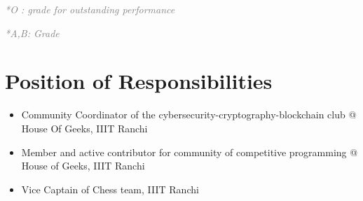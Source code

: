 \documentclass[a4,10pt]{article}
\def\gray#1{\textcolor{gray}{#1}}
\newenvironment{zitemize}{
\begin{itemize}\itemsep0pt \parskip0pt \parsep1pt}
{\end{itemize}\vspace{-0.5cm}}
\begin{document}
\vspace{0.2cm}
\renewcommand\refname{\vskip -1.5em}
\hspace{2.5 cm}
\begin{minipage}[t]{.4\linewidth}
     \gray{\emph{*O : grade for outstanding performance}}  
\end{minipage}%
\begin{minipage}[t]{.3\linewidth}
     \gray{\emph{*A,B: Grade}}
\end{minipage}%

\vspace{-0.4cm}



\section{Position of Responsibilities}
\begin{zitemize}
\item Community Coordinator of the cybersecurity-cryptography-blockchain club @ House Of Geeks, IIIT Ranchi 
\item Member and active contributor for community of competitive programming @ House of Geeks, IIIT Ranchi \\ %
\item Vice Captain of Chess team, IIIT Ranchi  
\end{zitemize}


\end{document}
